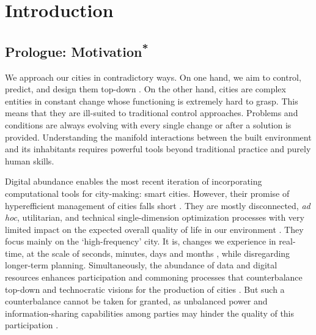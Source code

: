 \chapter{Introduction}
\label{ch:introduction}
\graphicspath{{chapters/00_introduction/figures/}}



\section{Prologue: Motivation\textsuperscript{*}} %

We approach our cities in contradictory ways. On one hand, we aim to control, predict, and design them top-down \citep{Gaffron2005}. On the other hand, cities are complex entities \citep{Port00} in constant change whose functioning is extremely hard to grasp. This means that they are ill-suited to traditional control approaches. Problems and conditions are always evolving with every single change or after a solution is provided. Understanding the manifold interactions between the built environment and its inhabitants requires powerful tools \citep{Fink2018} beyond traditional practice and purely human skills.

Digital abundance \citep{Hovestadt2017} enables the most recent iteration of incorporating computational tools for city-making: smart cities. However, their promise of hyperefficient management of cities \citep{Picon2015} falls short \citep{Greenfield2013}. They are mostly disconnected, \emph{ad hoc}, utilitarian, and technical single-dimension optimization processes \citep{Wilson2018} with very limited impact on the expected overall quality of life in our environment \citep{Batty2020smartcities}. They focus mainly on the ‘high-frequency’ city. It is, changes we experience in real-time, at the scale of seconds, minutes, days and months \citep{Batty2018AIandSmartCities, Wildfire2018}, while disregarding longer-term planning. Simultaneously, the abundance of data and digital resources enhances participation and commoning processes \citep{Cardullo2019, Mainka2016} that counterbalance top-down and technocratic visions for the production of cities \citep{Lefebvre1974}. But such a counterbalance cannot be taken for granted, as unbalanced power and information-sharing capabilities among parties may hinder the quality of this participation \citep{Pateman1970}.


